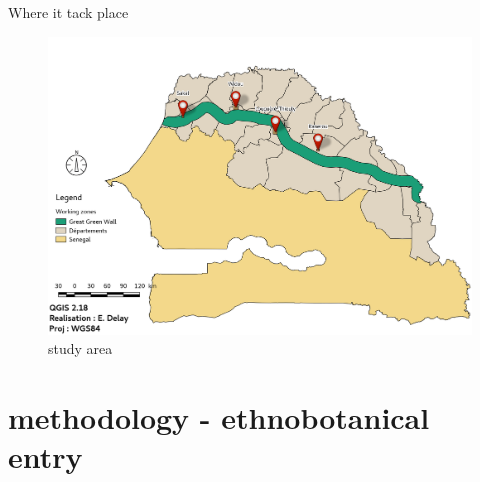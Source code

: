 \documentclass[newPxFont]{beamer}
\begin{document}
\begin{frame}[c]{Where it tack place}
\vspace{-1cm}
\begin{figure}
	\centering
	\includegraphics[width = \textwidth]{img/localisation_map}
	\caption{study area}
\end{figure}
\end{frame}

\section{methodology - ethnobotanical entry}
\end{document}
